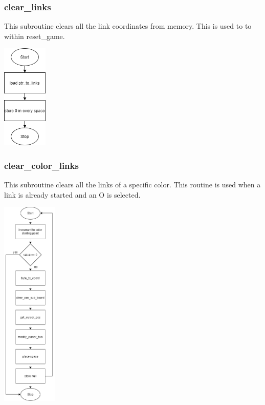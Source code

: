 \documentclass{article}
\begin{document}
    \subsubsection{clear\_links}
        This subroutine clears all the link coordinates from memory.
        This is used to to within reset\_game.
        \begin{center}
            {\includegraphics[height=5cm]{clear_links.png}\centering} 
        \end{center}
        \newpage   

    \subsubsection{clear\_color\_links}
        This subroutine clears all the links of a specific color.  
        This routine is used when a link is already started and
        an O is selected.
        \begin{center}
            {\includegraphics[height=10cm]{clear_color_links.png}\centering} 
        \end{center}
        \newpage
        
\end{document}

